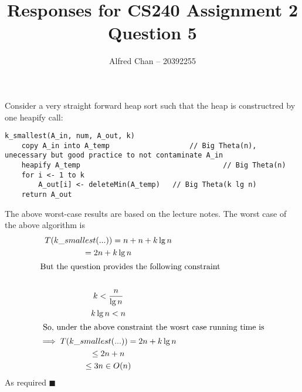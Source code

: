 \documentclass[12pt]{article}
\title{Responses for CS240 Assignment 2 Question 5}
\author{Alfred Chan -- 20392255}
\begin{document}
\maketitle
{}

Consider a very straight forward heap sort such that the heap is constructred by one heapify call:
\begin{lstlisting}
k_smallest(A_in, num, A_out, k) 
	copy A_in into A_temp 					// Big Theta(n), unecessary but good practice to not contaminate A_in
	heapify A_temp 									// Big Theta(n)
	for i <- 1 to k
		A_out[i] <- deleteMin(A_temp)	// Big Theta(k lg n)
	return A_out
\end{lstlisting}
The above worst-case results are based on the lecture notes.
The worst case of the above algorithm is
\begin{gather*}
T(k\_smallest(...)) = n + n + k\lg n\\
= 2n + k\lg n\\
\intertext{But the question provides the following constraint}\\
k < \frac{n}{\lg n}\\
k \lg n < n\\
\intertext{ So, under the above constraint the wosrt case running time is}
\implies T(k\_smallest(...)) = 2n + k\lg n\\
\le 2n + n\\
\le 3n \in O(n)
\end{gather*}
As required
\hfill $\blacksquare$
\end{document}
